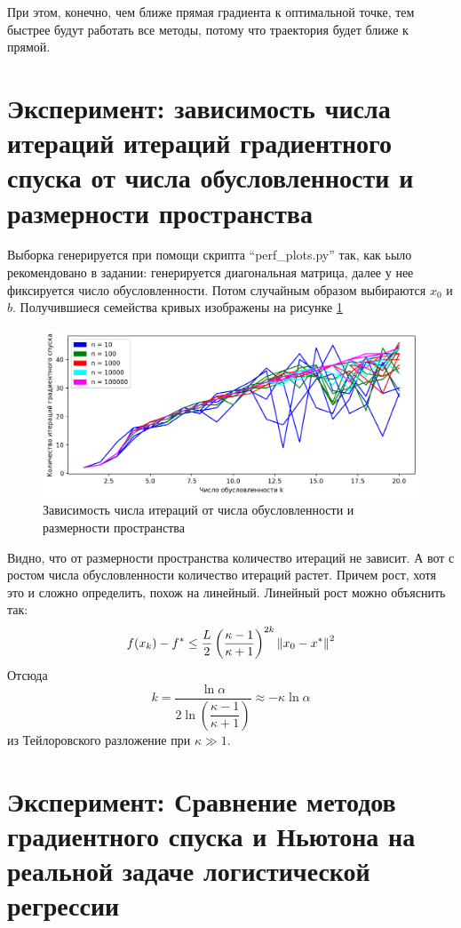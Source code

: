 \documentclass[notitlepage]{article}
\begin{document}
При этом, конечно, чем ближе прямая градиента к оптимальной точке, тем быстрее будут работать все методы, потому что траектория будет
ближе к прямой.

\section*{Эксперимент: зависимость числа итераций итераций градиентного спуска от числа обусловленности и размерности пространства}
Выборка генерируется при помощи скрипта ``perf\_plots.py'' так, как ьыло рекомендовано в задании:
генерируется диагональная матрица, далее у нее фиксируется число обусловленности. Потом случайным образом выбираются $x_0$ и $b$.
Получившиеся семейства кривых изображены на рисунке \ref{fig:perfplot}
\begin{figure}[ht]
  \centering
  \includegraphics[width=\linewidth, keepaspectratio]{plots/perf_gradients.png}
  \caption{Зависимость числа итераций от числа обусловленности и размерности пространства}
  \label{fig:perfplot}
\end{figure}

Видно, что от размерности пространства количество итераций не зависит. А вот с ростом числа обусловленности количество
итераций растет. Причем рост, хотя это и сложно определить, похож на линейный. Линейный рост можно объяснить так:
\begin{equation}
  f(x_k) - f^* \leq \frac L2 \left(\frac{\kappa - 1}{\kappa + 1}\right)^{2k} \norm{x_0 - x^*}^2
\end{equation}
Отсюда
\begin{equation}
  k = \frac{\ln\alpha}{2\ln\left(\dfrac{\kappa - 1}{\kappa + 1}\right)} \approx -\kappa\ln\alpha 
\end{equation}
из Тейлоровского разложение при $\kappa \gg 1$.

\section*{Эксперимент: Сравнение методов градиентного спуска и Ньютона на реальной задаче логистической регрессии}
\end{document}
